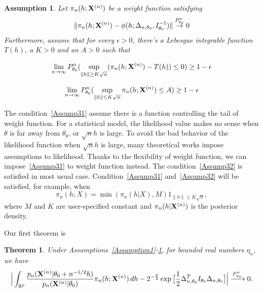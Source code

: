 \documentclass[3p]{elsarticle}
\theoremstyle{plain}
\newtheorem{theorem}{\quad\quad Theorem}
\newtheorem{assumption}{\quad\quad Assumption}
\theoremstyle{definition}
\theoremstyle{remark}
\begin{document}
\begin{assumption}\label{Assumption3}
    Let $\pi_n(h;\mathbf{X}^{(n)})$ be a weight function satisfying 
        \begin{equation}\label{vonMisesResults}
            \|\pi_n(h;\mathbf{X}^{(n)})-\phi(h;\Delta_{n,\theta_0},I_{\theta_0}^{-1})\|\overset{P_{\theta_0}^n}{\to}0
        \end{equation}
Furthermore, assume that for every $\epsilon>0$, there's a Lebesgue integrable function $T(h)$, a $K>0$ and an $A>0$ such that 

    \begin{equation}\label{Assump31}
        \lim_{n\to \infty}P_{\theta_0}^n(\sup_{\|h\|\geq K\sqrt{n}}(\pi_n(h;\mathbf{X}^{(n)})-T(h))\leq 0)\geq 1-\epsilon
\end{equation}

        \begin{equation}\label{Assump32}
            \lim_{n\to \infty} P_{\theta_0}^n(\sup_{\|h\|\leq K\sqrt{n}} \pi_n(h;\mathbf{X}^{(n)})\leq A)\geq 1-\epsilon
        \end{equation}
\end{assumption}


The condition~\ref{Assump31} assume there is a function controlling the tail of weight function. For a statistical model, the likelihood value makes no sense when $\theta$ is far away from $\theta_0$, or $\sqrt{n}h$ is large.
To avoid the bad behavior of the likelihood function when $\sqrt{n}h$ is large, many theoretical works impose assumptions to likelihood.
Thanks to the flexibility of weight function, we can impose~\ref{Assump31} to weight function instead.
The condition~\ref{Assump32} is satisfied in most usual case.
Condition~\ref{Assump31} and~\ref{Assump32} will be satisfied, for example, when 
\begin{equation}
    \pi_n(h;X)=\min(\pi_n(h|X),M) 1_{\|h\|\leq K\sqrt{n}},
\end{equation}
where $M$ and $K$ are user-specified constant and $\pi_n(h|\mathbf{X}^{(n)})$ is the posterior density.

Our first theorem is
\begin{theorem}\label{theoremMain}
    Under Assumptions~\ref{Assumption1}-\ref{Assumption3}, for bounded real numbers $\eta_n$, we have
    \begin{equation}
        \Big|\int_{\mathbb{R}^{p}}\frac{p_n(\mathbf{X}^{(n)}|\theta_0+n^{-1/2}h)}{p_n(\mathbf{X}^{(n)}|\theta_0)}\pi_n(h;\mathbf{X}^{(n)})\,dh-
        2^{-\frac{p}{2}}\exp\big[\frac{1}{2}\Delta_{n,\theta_0}^T I_{\theta_0}\Delta_{n,\theta_0}\big]
        \Big|\xrightarrow{P_{\eta_n}^n}0.
    \end{equation}
\end{theorem}
\end{document}
